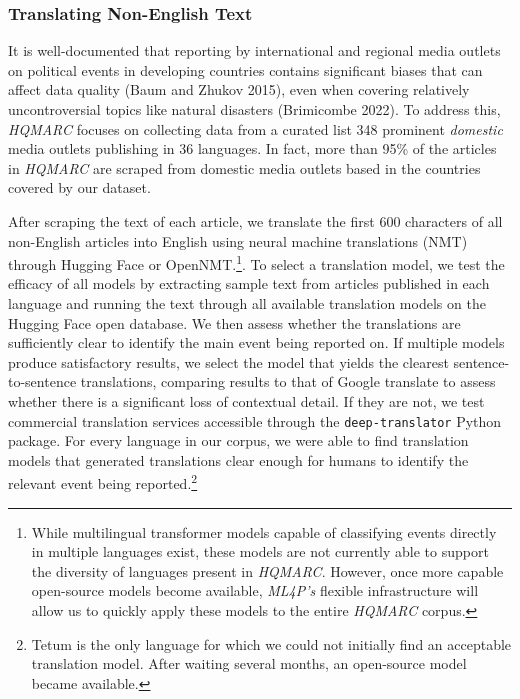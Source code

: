 \documentclass[
  letterpaper,
  DIV=11,
  numbers=noendperiod]{scrartcl}
\begin{document}
\hypertarget{translating-non-english-text}{%
\subsubsection{Translating Non-English
Text}\label{translating-non-english-text}}

It is well-documented that reporting by international and regional media
outlets on political events in developing countries contains significant
biases that can affect data quality (Baum and Zhukov 2015), even when
covering relatively uncontroversial topics like natural disasters
(Brimicombe 2022). To address this, \emph{HQMARC} focuses on collecting
data from a curated list 348 prominent \emph{domestic} media outlets
publishing in 36 languages. In fact, more than 95\% of the articles in
\emph{HQMARC} are scraped from domestic media outlets based in the
countries covered by our dataset.

After scraping the text of each article, we translate the first 600
characters of all non-English articles into English using neural machine
translations (NMT) through Hugging Face or OpenNMT.\footnote{While
  multilingual transformer models capable of classifying events directly
  in multiple languages exist, these models are not currently able to
  support the diversity of languages present in \emph{HQMARC}. However,
  once more capable open-source models become available, \emph{ML4P's}
  flexible infrastructure will allow us to quickly apply these models to
  the entire \emph{HQMARC} corpus.}. To select a translation model, we
test the efficacy of all models by extracting sample text from articles
published in each language and running the text through all available
translation models on the Hugging Face open database. We then assess
whether the translations are sufficiently clear to identify the main
event being reported on. If multiple models produce satisfactory
results, we select the model that yields the clearest
sentence-to-sentence translations, comparing results to that of Google
translate to assess whether there is a significant loss of contextual
detail. If they are not, we test commercial translation services
accessible through the \texttt{deep-translator} Python package. For
every language in our corpus, we were able to find translation models
that generated translations clear enough for humans to identify the
relevant event being reported.\footnote{Tetum is the only language for
  which we could not initially find an acceptable translation model.
  After waiting several months, an open-source model became available.}
\end{document}
